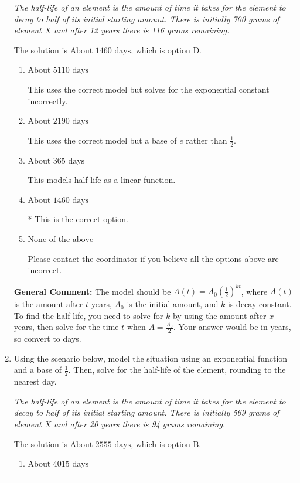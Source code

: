 \documentclass{extbook}[14pt]
\newcommand{\litem}[1]{\item #1

\rule{\textwidth}{0.4pt}}
\begin{document}
\begin{enumerate}
{\begin{center}
    \textit{ The half-life of an element is the amount of time it takes for the element to decay to half of its initial starting amount. There is initially 700 grams of element $X$ and after 12 years there is 116 grams remaining. }
\end{center}


The solution is \( \text{About } 1460 \text{ days} \), which is option D.\begin{enumerate}[label=\Alph*.]
\item \( \text{About } 5110 \text{ days} \)

This uses the correct model but solves for the exponential constant incorrectly.
\item \( \text{About } 2190 \text{ days} \)

This uses the correct model but a base of $e$ rather than $\frac{1}{2}$.
\item \( \text{About } 365 \text{ days} \)

This models half-life as a linear function.
\item \( \text{About } 1460 \text{ days} \)

* This is the correct option.
\item \( \text{None of the above} \)

Please contact the coordinator if you believe all the options above are incorrect.
\end{enumerate}

\textbf{General Comment:} The model should be $A(t) = A_0 (\frac{1}{2})^{kt}$, where $A(t)$ is the amount after $t$ years, $A_0$ is the initial amount, and $k$ is decay constant. To find the half-life, you need to solve for $k$ by using the amount after $x$ years, then solve for the time $t$ when $A = \frac{A_0}{2}$. Your answer would be in years, so convert to days.
}
\litem{
Using the scenario below, model the situation using an exponential function and a base of $\frac{1}{2}$. Then, solve for the half-life of the element, rounding to the nearest day.

\begin{center}
    \textit{ The half-life of an element is the amount of time it takes for the element to decay to half of its initial starting amount. There is initially 569 grams of element $X$ and after 20 years there is 94 grams remaining. }
\end{center}


The solution is \( \text{About } 2555 \text{ days} \), which is option B.\begin{enumerate}[label=\Alph*.]
\item \( \text{About } 4015 \text{ days} \)


\end{enumerate}}
\end{enumerate}
\end{document}
